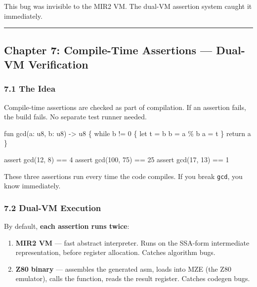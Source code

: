 \documentclass[
  11pt,
  a4paper,
]{report}
\newenvironment{Shaded}{\begin{snugshade}\small}{\end{snugshade}}
\newcommand{\NormalTok}[1]{#1}
\begin{document}
This bug was invisible to the MIR2 VM. The dual-VM assertion system
caught it immediately.

\begin{center}\rule{0.5\linewidth}{0.5pt}\end{center}

\subsection{Chapter 7: Compile-Time Assertions --- Dual-VM
Verification}\label{chapter-7-compile-time-assertions-dual-vm-verification}

\subsubsection{7.1 The Idea}\label{the-idea}

Compile-time assertions are checked as part of compilation. If an
assertion fails, the build fails. No separate test runner needed.

\begin{Shaded}
\begin{Highlighting}[]
\NormalTok{fun gcd(a: u8, b: u8) {-}\textgreater{} u8 \{}
\NormalTok{    while b != 0 \{}
\NormalTok{        let t = b}
\NormalTok{        b = a \% b}
\NormalTok{        a = t}
\NormalTok{    \}}
\NormalTok{    return a}
\NormalTok{\}}

\NormalTok{assert gcd(12, 8) == 4}
\NormalTok{assert gcd(100, 75) == 25}
\NormalTok{assert gcd(17, 13) == 1}
\end{Highlighting}
\end{Shaded}

These three assertions run every time the code compiles. If you break
\texttt{gcd}, you know immediately.

\subsubsection{7.2 Dual-VM Execution}\label{dual-vm-execution}

By default, \textbf{each assertion runs twice}:

\begin{enumerate}
\def\labelenumi{\arabic{enumi}.}
\item
  \textbf{MIR2 VM} --- fast abstract interpreter. Runs on the SSA-form
  intermediate representation, before register allocation. Catches
  algorithm bugs.
\item
  \textbf{Z80 binary} --- assembles the generated asm, loads into MZE
  (the Z80 emulator), calls the function, reads the result register.
  Catches codegen bugs.
\end{enumerate}
\end{document}
